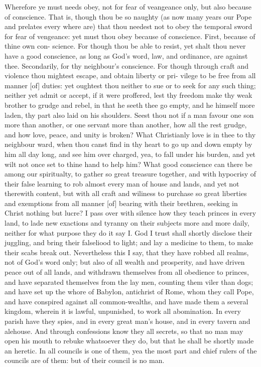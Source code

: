 \documentclass{custom}
\begin{document}
Wherefore ye must needs obey, not for fear of veangeance 
only, but also because of conscience. That is, though 
thou be so naughty (as now many years our Pope and 
prelates every where are) that thou needest not to obey the 
temporal sword for fear of vengeance: yet must thou obey 
because of conscience. First, because of thine own con- 
science. For though thou be able to resist, yet shalt thou 
never have a good conscience, as long as God's word, law,
and ordinance, are against thee. Secondarily, for thy 
neighbour's conscience. For though through craft and 
violence thou mightest escape, and obtain liberty or pri- 
vilege to be free from all manner [of] duties: yet oughtest 
thou neither to sue or to seek for any such thing; neither 
yet admit or accept, if it were proffered, lest thy freedom 
make thy weak brother to grudge and rebel, in that he 
seeth thee go empty, and he himself more laden, thy part 
also laid on his shoulders. Seest thou not if a man favour 
one son more than another, or one servant more than 
another, how all the rest grudge, and how love, peace, and 
unity is broken? What Christianly love is in thee to thy 
neighbour ward, when thou canst find in thy heart to go 
up and down empty by him all day long, and see him over 
charged, yea, to fall under his burden, and yet wilt not 
once set to thine hand to help him? What good conscience 
can there be among our spiritualty, to gather so great 
treasure together, and with hypocrisy of their false learning 
to rob almost every man of house and lands, and yet not 
therewith content, but with all craft and wiliness to purchase 
so great liberties and exemptions from all manner [of] bearing 
with their brethren, seeking in Christ nothing but lucre?
I pass over with silence how they teach princes in every 
land, to lade new exactions and tyranny on their subjects 
more and more daily, neither for what purpose they do it 
say I. God I trust shall shortly disclose their juggling, 
and bring their falseliood to light; and lay a medicine to 
them, to make their scabs break out. Nevertheless this I 
say, that they have robbed all realms, not of God's word 
only; but also of all wealth and prosperity, and have driven 
peace out of all lands, and withdrawn themselves from all 
obedience to princes, and have separated themselves from 
the lay men, counting them viler than dogs; and have set 
up the whore of Babylon, antichrist of Rome, whom they 
call Pope, and have conspired against all common-wealths, 
and have made them a several kingdom, wherein it is 
lawful, unpunished, to work all abomination. In every 
parish have they spies, and in every great man's house, and 
in every tavern and alehouse. And through confessions 
know they all secrets, so that no man may open his mouth 
to rebuke whatsoever they do, but that he shall be shortly 
made an heretic. In all councils is one of them, yea the 
most part and chief rulers of the councils are of them:
but of their council is no man. 
\end{document}
